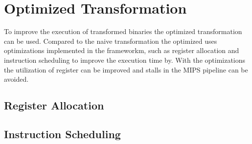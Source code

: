 \section{Optimized Transformation}
To improve the execution of transformed binaries the optimized transformation
can be used. Compared to the naive transformation the optimized uses optimizations
implemented in the frameworkm, such as register allocation and instruction scheduling
to improve the execution time by. With the optimizations the utilization of register
can be improved and stalls in the MIPS pipeline can be avoided.


\subsection{Register Allocation}

\subsection{Instruction Scheduling}

